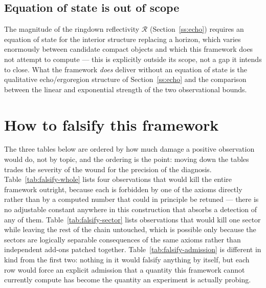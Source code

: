 \documentclass[pdflatex,sn-mathphys-num]{sn-jnl}
\theoremstyle{thmstyleone}
\theoremstyle{thmstylethree}
\theoremstyle{thmstyletwo}
\begin{document}
\subsection{Equation of state is out of scope}\label{ss:eos-out}

The magnitude of the ringdown reflectivity $\mathcal{R}$
(Section~\ref{ss:echo}) requires an equation of state for the interior
structure replacing a horizon, which varies enormously between candidate
compact objects and which this framework does not attempt to compute —
this is explicitly outside its scope, not a gap it intends to close. What
the framework \emph{does} deliver without an equation of state is the
qualitative echo/ergoregion structure of Section~\ref{ss:echo} and the
comparison between the linear and exponential strength of the two
observational bounds.

\section{How to falsify this framework}\label{sec:falsify}

The three tables below are ordered by how much damage a positive
observation would do, not by topic, and the ordering is the point:
moving down the tables trades the severity of the wound for the
precision of the diagnosis. Table~\ref{tab:falsify-whole} lists four
observations that would kill the entire framework outright, because each
is forbidden by one of the axioms directly rather than by a computed
number that could in principle be retuned — there is no adjustable
constant anywhere in this construction that absorbs a detection of any
of them. Table~\ref{tab:falsify-sector} lists observations that would
kill one sector while leaving the rest of the chain untouched, which is
possible only because the sectors are logically separable consequences
of the same axioms rather than independent add-ons patched together.
Table~\ref{tab:falsify-admission} is different in kind from the first
two: nothing in it would falsify anything by itself, but each row would
force an explicit admission that a quantity this framework cannot
currently compute has become the quantity an experiment is actually
probing.
\end{document}

